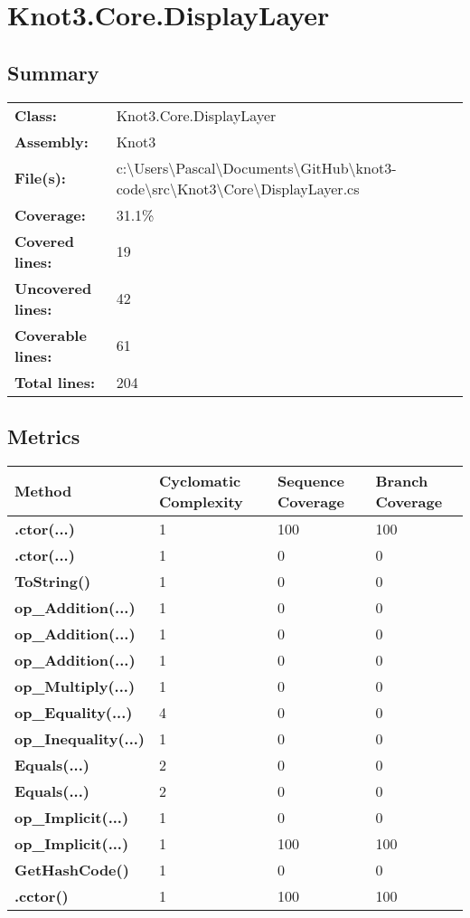 \documentclass[a4paper,10pt]{article}
\begin{document}
\section{Knot3.Core.DisplayLayer}
\subsection{Summary}
\begin{longtable}[l]{ll}
\textbf{Class:} & Knot3.Core.DisplayLayer\\
\textbf{Assembly:} & Knot3\\
\textbf{File(s):} & \begin{minipage}[t]{12cm}{c:\textbackslash Users\textbackslash Pascal\textbackslash Documents\textbackslash GitHub\textbackslash knot3-code\textbackslash src\textbackslash Knot3\textbackslash Core\textbackslash DisplayLayer.cs}\end{minipage} \\
\textbf{Coverage:} & 31.1\%\\
\textbf{Covered lines:} & 19\\
\textbf{Uncovered lines:} & 42\\
\textbf{Coverable lines:} & 61\\
\textbf{Total lines:} & 204\\
\end{longtable}
\subsection{Metrics}
\begin{longtable}[l]{|l|l|l|l|}
\hline
\textbf{Method} & \textbf{Cyclomatic Complexity} & \textbf{Sequence Coverage} & \textbf{Branch Coverage}\\
\hline
\textbf{.ctor(...)} & 1 & 100 & 100\\
\hline
\textbf{.ctor(...)} & 1 & 0 & 0\\
\hline
\textbf{ToString()} & 1 & 0 & 0\\
\hline
\textbf{op\_Addition(...)} & 1 & 0 & 0\\
\hline
\textbf{op\_Addition(...)} & 1 & 0 & 0\\
\hline
\textbf{op\_Addition(...)} & 1 & 0 & 0\\
\hline
\textbf{op\_Multiply(...)} & 1 & 0 & 0\\
\hline
\textbf{op\_Equality(...)} & 4 & 0 & 0\\
\hline
\textbf{op\_Inequality(...)} & 1 & 0 & 0\\
\hline
\textbf{Equals(...)} & 2 & 0 & 0\\
\hline
\textbf{Equals(...)} & 2 & 0 & 0\\
\hline
\textbf{op\_Implicit(...)} & 1 & 0 & 0\\
\hline
\textbf{op\_Implicit(...)} & 1 & 100 & 100\\
\hline
\textbf{GetHashCode()} & 1 & 0 & 0\\
\hline
\textbf{.cctor()} & 1 & 100 & 100\\
\hline
\end{longtable}
\end{document}

